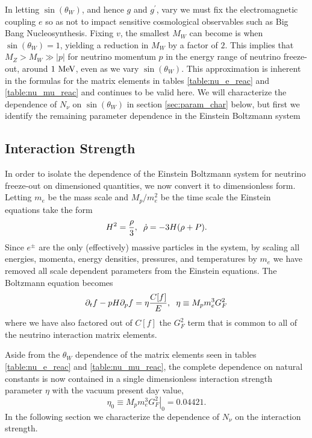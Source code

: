 In letting $\sin(\theta_W)$, and hence $g$ and $g^{'}$, vary we must fix the electromagnetic coupling $e$ so as not to impact sensitive cosmological observables such as Big Bang Nucleosynthesis.  Fixing $v$, the smallest $M_W$ can become is when $\sin(\theta_W)=1$, yielding a reduction in $M_W$ by a factor of $2$.  This implies that $M_Z>M_W\gg |p|$ for neutrino momentum $p$ in the energy range of neutrino freeze-out, around $1\text{ MeV}$, even as we vary $\sin(\theta_W)$.  This approximation is inherent in the formulas for the matrix elements  in tables  \ref{table:nu_e_reac} and \ref{table:nu_mu_reac} and continues to be valid here. We will characterize the dependence of $N_\nu$ on $\sin(\theta_W)$ in section \ref{sec:param_char} below, but first we identify the remaining parameter dependence in the Einstein Boltzmann system


\subsection{Interaction Strength}
 In order to isolate the dependence of the Einstein Boltzmann system for neutrino freeze-out on dimensioned quantities, we now convert it to dimensionless form. Letting $m_e$ be the mass scale and $M_p/m_e^2$ be the time scale the Einstein equations take the form
\begin{equation}
H^2=\frac{\rho}{3},\hspace{2mm}\dot\rho=-3H(\rho+P).
\end{equation}
 Since $e^\pm$ are the only (effectively) massive particles in the system, by scaling all energies, momenta, energy densities, pressures, and temperatures by $m_e$ we have removed all scale dependent parameters from the Einstein equations.  The Boltzmann equation becomes
\begin{equation}\label{eta_def}
\partial_tf-pH\partial_pf=\eta\frac{C[f]}{E},\hspace{2mm}\eta\equiv M_p m_e^3G_F^2
\end{equation}
where we have also factored out of $C[f]$ the $G_F^2$ term that is common to all of the neutrino interaction matrix elements. 

Aside from the $\theta_W$ dependence of the matrix elements seen in tables \ref{table:nu_e_reac} and \ref{table:nu_mu_reac}, the complete dependence on natural constants  is now contained in a single dimensionless interaction strength parameter $\eta$ with the vacuum present day value,
\begin{equation}\label{eta0_def}
\eta_0\equiv \left.M_p m_e^3 G_F^2\right|_0  = 0.04421 .
\end{equation}
In the following section we characterize the dependence of $N_\nu$ on the interaction strength.  




